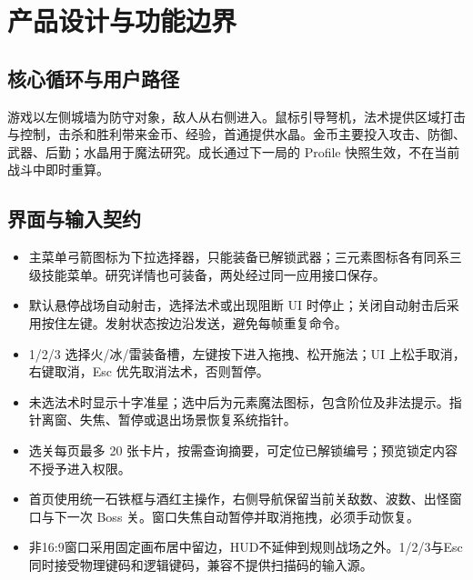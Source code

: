 \documentclass[UTF8,a4paper,11pt,fontset=windows]{ctexart}
\newcommand{\nextsection}[1]{\par\bigskip\section{#1}}
\begin{document}
\nextsection{产品设计与功能边界}
\subsection{核心循环与用户路径}
游戏以左侧城墙为防守对象，敌人从右侧进入。鼠标引导弩机，法术提供区域打击与控制，击杀和胜利带来金币、经验，首通提供水晶。金币主要投入攻击、防御、武器、后勤；水晶用于魔法研究。成长通过下一局的 Profile 快照生效，不在当前战斗中即时重算。

\begin{center}
\end{center}

\subsection{界面与输入契约}
\begin{itemize}
\item 主菜单弓箭图标为下拉选择器，只能装备已解锁武器；三元素图标各有同系三级技能菜单。研究详情也可装备，两处经过同一应用接口保存。
\item 默认悬停战场自动射击，选择法术或出现阻断 UI 时停止；关闭自动射击后采用按住左键。发射状态按边沿发送，避免每帧重复命令。
\item 1/2/3 选择火/冰/雷装备槽，左键按下进入拖拽、松开施法；UI 上松手取消，右键取消，Esc 优先取消法术，否则暂停。
\item 未选法术时显示十字准星；选中后为元素魔法图标，包含阶位及非法提示。指针离窗、失焦、暂停或退出场景恢复系统指针。
\item 选关每页最多 20 张卡片，按需查询摘要，可定位已解锁编号；预览锁定内容不授予进入权限。
\item 首页使用统一石铁框与酒红主操作，右侧导航保留当前关敌数、波数、出怪窗口与下一次 Boss 关。窗口失焦自动暂停并取消拖拽，必须手动恢复。
\item 非16:9窗口采用固定画布居中留边，HUD不延伸到规则战场之外。1/2/3与Esc同时接受物理键码和逻辑键码，兼容不提供扫描码的输入源。
\end{itemize}
\end{document}
